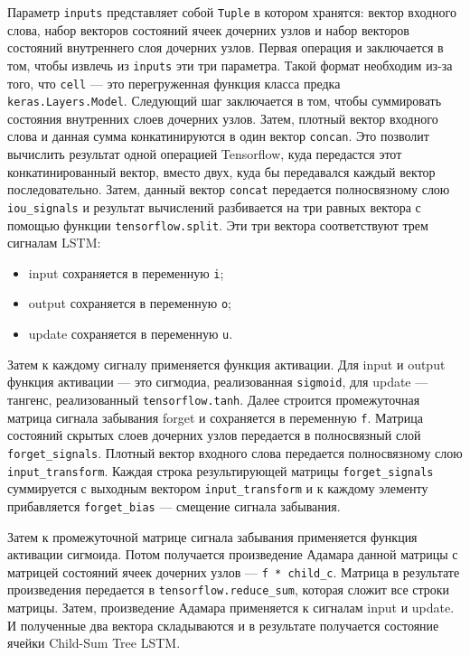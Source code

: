 Параметр \texttt{inputs} представляет собой \texttt{Tuple} в котором хранятся: вектор входного слова, набор векторов состояний ячеек дочерних узлов и набор векторов состояний внутреннего слоя дочерних узлов. Первая операция и заключается в том, чтобы извлечь из \texttt{inputs} эти три параметра. Такой формат необходим из-за того, что \texttt{cell} --- это перегруженная функция класса предка \texttt{keras.Layers.Model}. Следующий шаг заключается в том, чтобы суммировать состояния внутренних слоев дочерних узлов. Затем, плотный вектор входного слова и данная сумма конкатинируются в один вектор \texttt{concan}. Это позволит вычислить результат одной операцией Tensorflow, куда передастся этот конкатинированный вектор, вместо двух, куда бы передавался каждый вектор последовательно. Затем, данный вектор \texttt{concat} передается полносвязному слою \texttt{iou\_signals} и результат вычислений разбивается на три равных вектора с помощью функции \texttt{tensorflow.split}. Эти три вектора соответствуют трем сигналам LSTM\@:
\begin{itemize}
\item input сохраняется в переменную \texttt{i};
\item output сохраняется в переменную \texttt{o};
\item update сохраняется в переменную \texttt{u}.
\end{itemize}

Затем к каждому сигналу применяется функция активации. Для input и output функция активации --- это сигмодиа, реализованная \texttt{sigmoid}, для update --- тангенс, реализованный \texttt{tensorflow.tanh}. Далее строится промежуточная матрица сигнала забывания forget и сохраняется в переменную \texttt{f}. Матрица состояний скрытых слоев дочерних узлов передается в полносвязный слой \texttt{forget\_signals}. Плотный вектор входного слова передается полносвязному слою \texttt{input\_transform}. Каждая строка результирующей матрицы \texttt{forget\_signals} суммируется с выходным вектором \texttt{input\_\-transform} и к каждому элементу прибавляется \texttt{forget\_bias} --- смещение сигнала забывания.

Затем к промежуточной матрице сигнала забывания применяется функция активации сигмоида. Потом получается произведение Адамара данной матрицы с матрицей состояний ячеек дочерних узлов --- \texttt{f * child\_c}. Матрица в результате произведения передается в \texttt{tensorflow.reduce\_sum}, которая сложит все строки матрицы. Затем, произведение Адамара применяется к сигналам input и update. И полученные два вектора складываются и в результате получается состояние ячейки Child-Sum Tree LSTM\@.

